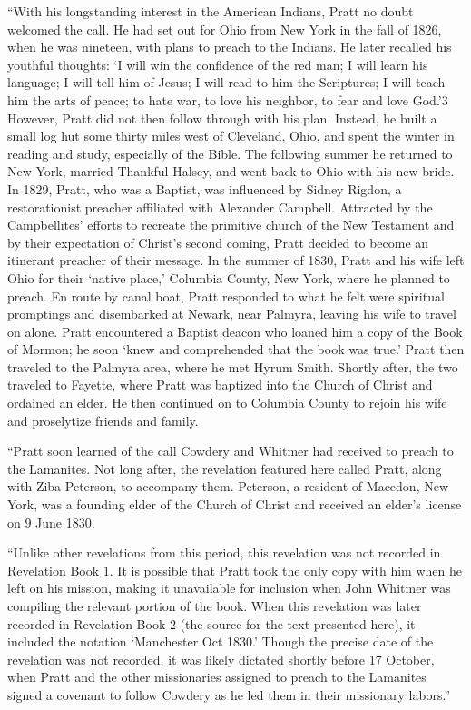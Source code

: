			``With his longstanding interest in the American Indians, Pratt no doubt welcomed the call. He had set out for Ohio from New York in the fall of 1826, when he was nineteen, with plans to preach to the Indians. He later recalled his youthful thoughts: `I will win the confidence of the red man; I will learn his language; I will tell him of Jesus; I will read to him the Scriptures; I will teach him the arts of peace; to hate war, to love his neighbor, to fear and love God.'3 However, Pratt did not then follow through with his plan. Instead, he built a small log hut some thirty miles west of Cleveland, Ohio, and spent the winter in reading and study, especially of the Bible. The following summer he returned to New York, married Thankful Halsey, and went back to Ohio with his new bride. In 1829, Pratt, who was a Baptist, was influenced by Sidney Rigdon, a restorationist preacher affiliated with Alexander Campbell. Attracted by the Campbellites' efforts to recreate the primitive church of the New Testament and by their expectation of Christ's second coming, Pratt decided to become an itinerant preacher of their message. In the summer of 1830, Pratt and his wife left Ohio for their `native place,' Columbia County, New York, where he planned to preach. En route by canal boat, Pratt responded to what he felt were spiritual promptings and disembarked at Newark, near Palmyra, leaving his wife to travel on alone. Pratt encountered a Baptist deacon who loaned him a copy of the Book of Mormon; he soon `knew and comprehended that the book was true.' Pratt then traveled to the Palmyra area, where he met Hyrum Smith. Shortly after, the two traveled to Fayette, where Pratt was baptized into the Church of Christ and ordained an elder. He then continued on to Columbia County to rejoin his wife and proselytize friends and family.
			
			``Pratt soon learned of the call Cowdery and Whitmer had received to preach to the Lamanites. Not long after, the revelation featured here called Pratt, along with Ziba Peterson, to accompany them. Peterson, a resident of Macedon, New York, was a founding elder of the Church of Christ and received an elder's license on 9 June 1830.
			
			``Unlike other revelations from this period, this revelation was not recorded in Revelation Book 1. It is possible that Pratt took the only copy with him when he left on his mission, making it unavailable for inclusion when John Whitmer was compiling the relevant portion of the book. When this revelation was later recorded in Revelation Book 2 (the source for the text presented here), it included the notation `Manchester Oct 1830.' Though the precise date of the revelation was not recorded, it was likely dictated shortly before 17 October, when Pratt and the other missionaries assigned to preach to the Lamanites signed a covenant to follow Cowdery as he led them in their missionary labors.''
			
